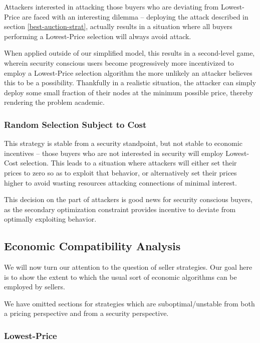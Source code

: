Attackers interested in attacking those buyers who are deviating from
Lowest-Price are faced with an interesting dilemma -- deploying the
attack described in section \ref{best-auction-strat}, actually results
in a situation where all buyers performing a Lowest-Price selection
will always avoid attack.

When applied outside of our simplified model, this results in a
second-level game, wherein security conscious users become
progressively more incentivized to employ a Lowest-Price selection
algorithm the more unlikely an attacker believes this to be a
possibility. Thankfully in a realistic situation, the attacker can
simply deploy some small fraction of their nodes at the minimum
possible price, thereby rendering the problem academic.

\subsubsection{Random Selection Subject to Cost}

This strategy is stable from a security standpoint, but not stable to
economic incentives -- those buyers who are not interested in security
will employ Lowest-Cost selection. This leads to a situation where
attackers will either set their prices to zero so as to exploit that
behavior, or alternatively set their prices higher to avoid wasting
resources attacking connections of minimal interest.

This decision on the part of attackers is good news for security
conscious buyers, as the secondary optimization constraint provides
incentive to deviate from optimally exploiting behavior.

\subsection{Economic Compatibility Analysis}

We will now turn our attention to the question of seller
strategies. Our goal here is to show the extent to which the usual
sort of economic algorithms can be employed by sellers.

We have omitted sections for strategies which are suboptimal/unstable
from both a pricing perspective and from a security perspective.

\subsubsection{Lowest-Price}

